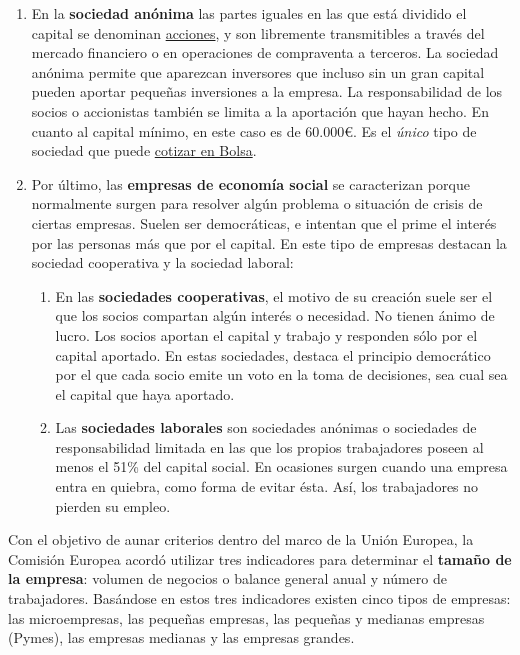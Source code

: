 \documentclass[12pt,a4paper,spanish]{report}
\begin{document}
\begin{enumerate}
				\item En la \textbf{sociedad anónima} las partes iguales en las que está dividido el capital se denominan \underline{acciones}, y son libremente transmitibles a través del mercado financiero o en operaciones de compraventa a terceros. La sociedad anónima permite que aparezcan inversores que incluso sin un gran capital pueden aportar pequeñas inversiones a la empresa. La responsabilidad de los socios o accionistas también se limita a la aportación que hayan hecho. En cuanto al capital mínimo, en este caso es de 60.000\euro. Es el \textcolor[rgb]{0.5,0.8,0.9}{\emph{único}} tipo de sociedad que puede \underline{cotizar en Bolsa}.

				\item Por último, las \textbf{empresas de economía social} se caracterizan porque normalmente surgen para resolver algún problema o situación de crisis de ciertas empresas. Suelen ser democráticas, e intentan que el prime el interés por las personas más que por el capital. En este tipo de empresas destacan la sociedad cooperativa y la sociedad laboral: 
				\begin{enumerate}
					\item En las \textbf{sociedades cooperativas}, el motivo de su creación suele ser el que los socios compartan algún interés o necesidad. No tienen ánimo de lucro. Los socios aportan el capital y trabajo y responden sólo por el capital aportado. En estas sociedades, destaca el principio democrático por el que cada socio emite un voto en la toma de decisiones, sea cual sea el capital que haya aportado. 

					\item Las \textbf{sociedades laborales} son sociedades anónimas o sociedades de responsabilidad limitada en las que los propios trabajadores poseen al menos el 51\% del capital social. En ocasiones surgen cuando una empresa entra en quiebra, como forma de evitar ésta. Así, los trabajadores no pierden su empleo.

				\end{enumerate}
			\end{enumerate}
			Con el objetivo de aunar criterios dentro del marco de la Unión Europea, la Comisión Europea acordó utilizar tres indicadores para determinar el \textbf{tamaño de la empresa}: volumen de negocios o balance general anual y número de trabajadores. Basándose en estos tres indicadores existen cinco tipos de empresas: las microempresas, las pequeñas empresas, las pequeñas y medianas empresas (Pymes), las empresas medianas y las empresas grandes.
			
\end{document}
